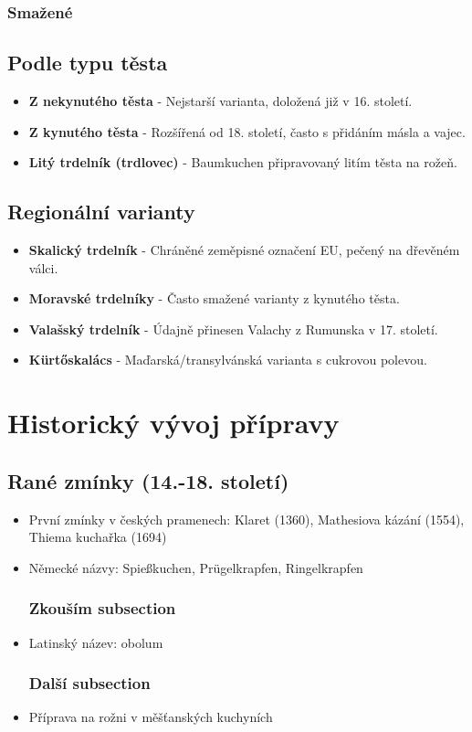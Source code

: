 \documentclass[a5paper,10pt]{book}
\begin{document}
\lipsum[1-3]

\subsection{Smažené}

\lipsum[4-6]


\section{Podle typu těsta}
\begin{itemize}
\item \textbf{Z nekynutého těsta} - Nejstarší varianta, doložená již v 16. století.
\item \textbf{Z kynutého těsta} - Rozšířená od 18. století, často s přidáním másla a vajec.
\item \textbf{Litý trdelník (trdlovec)} - Baumkuchen připravovaný litím těsta na rožeň.
\end{itemize}

\section{Regionální varianty}
\begin{itemize}
\item \textbf{Skalický trdelník} - Chráněné zeměpisné označení EU, pečený na dřevěném válci.
\item \textbf{Moravské trdelníky} - Často smažené varianty z kynutého těsta.
\item \textbf{Valašský trdelník} - Údajně přinesen Valachy z Rumunska v 17. století.
\item \textbf{Kürtőskalács} - Maďarská/transylvánská varianta s cukrovou polevou.
\end{itemize}

\chapter{Historický vývoj přípravy}
\section{Rané zmínky (14.-18. století)}
\begin{itemize}
\item První zmínky v českých pramenech: Klaret (1360), Mathesiova kázání (1554), Thiema kuchařka (1694)
\item Německé názvy: Spießkuchen, Prügelkrapfen, Ringelkrapfen
\subsection{Zkouším subsection}
\item Latinský název: obolum
\subsection{Další subsection}
\item Příprava na rožni v měšťanských kuchyních
\end{itemize}
\end{document}
